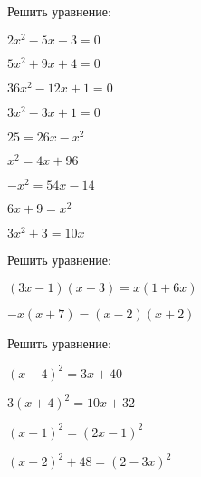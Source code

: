 \begin{class}[number=3]
	\begin{listofex}
		\item Решить уравнение:
		\begin{enumcols}[itemcolumns=2]
			\item \( 2x^2-5x-3=0 \)
			\item \( 5x^2+9x+4=0 \)
			\item \( 36x^2-12x+1=0 \)
			\item \( 3x^2-3x+1=0 \)
			\item \( 25=26x-x^2 \)
			\item \( x^2=4x+96 \)
			\item \( -x^2=54x-14 \)
			\item \( 6x+9=x^2 \)
			\item \( 3x^2+3=10x \)
		\end{enumcols}
		\item Решить уравнение:
		\begin{enumcols}[itemcolumns=2]
			\item \( (3x-1)(x+3)=x(1+6x) \)
			\item \( -x(x+7)=(x-2)(x+2) \)
		\end{enumcols}
		\item Решить уравнение:
		\begin{enumcols}[itemcolumns=2]
			\item \( (x+4)^2=3x+40 \)
			\item \( 3(x+4)^2=10x+32 \)
			\item \( (x+1)^2=(2x-1)^2 \)
			\item \( (x-2)^2+48=(2-3x)^2 \)
		\end{enumcols}
	\end{listofex}
\end{class}
%
